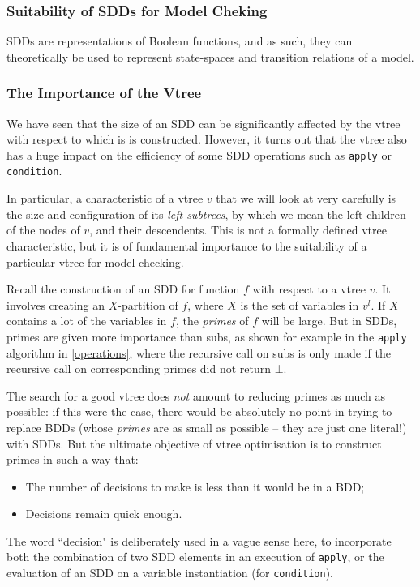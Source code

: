 \documentclass[11pt]{article}
\begin{document}
\subsubsection{Suitability of SDDs for Model Cheking}

SDDs are representations of Boolean functions, and as such, they can theoretically be used to represent state-spaces and transition relations of a model. 

\subsubsection{The Importance of the Vtree}

We have seen that the size of an SDD can be significantly affected by the vtree with respect to which is is constructed. However, it turns out that the vtree also has a huge impact on the efficiency of some SDD operations such as \texttt{apply} or \texttt{condition}. 

In particular, a characteristic of a vtree $v$ that we will look at very carefully is the size and configuration of its \textit{left subtrees}, by which we mean the left children of the nodes of $v$, and their descendents.	This is not a formally defined vtree characteristic, but it is of fundamental importance to the suitability of a particular vtree for model checking. 

Recall the construction of an SDD for function $f$ with respect to a vtree $v$. It involves creating an $X$-partition of $f$, where $X$ is the set of variables in $v^l$. If $X$ contains a lot of the variables in $f$, the \textit{primes} of $f$ will be large. But in SDDs, primes are given more importance than subs, as shown for example in the \texttt{apply} algorithm in \ref{operations}, where the recursive call on subs is only made if the recursive call on corresponding primes did not return $\bot$.

The search for a good vtree does \textit{not }amount to reducing primes as much as possible: if this were the case, there would be absolutely no point in trying to replace BDDs (whose \textit{primes} are as small as possible -- they are just one literal!) with SDDs. But the ultimate objective of vtree optimisation is to construct primes in such a way that: \begin{itemize}
\item The number of decisions to make is less than it would be in a BDD;
\item Decisions remain quick enough.
\end{itemize}
The word ``decision" is deliberately used in a vague sense here, to incorporate both the combination of two SDD elements in an execution of \texttt{apply}, or the evaluation of an SDD on a variable instantiation (for \texttt{condition}).
\end{document}
